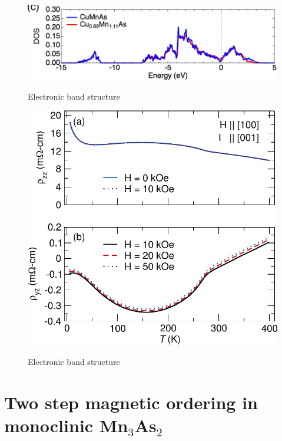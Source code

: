\documentclass[11pt,edeposit,draftthesis]{uiucthesis2020}
\begin{document}
\begin{mainmatter}
\begin{figure}
\centering\includegraphics[width=\columnwidth]{figures/ch5/DOS_CuMnAs.png} \\
\caption{\label{fig:DOS}
Electronic band structure
}
\end{figure}

\begin{figure}
\centering\includegraphics[width=\columnwidth]{figures/ch5/resistivity_data_hall_cropped.pdf} \\
\caption{\label{fig:resistivity}
Electronic band structure
}
\end{figure}

\Blindtext[6]

\chapter{Two step magnetic ordering in monoclinic Mn$_3$As$_2$}


\end{mainmatter}
\end{document}
